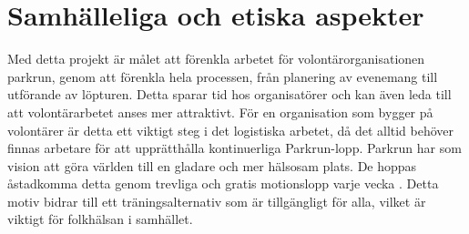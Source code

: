 \section{Samhälleliga och etiska aspekter}

Med detta projekt är målet att förenkla arbetet för volontärorganisationen parkrun, genom att förenkla hela processen, från planering av evenemang till utförande av löpturen. Detta sparar tid hos organisatörer och kan även leda till att volontärarbetet anses mer attraktivt. För en organisation som bygger på volontärer är detta ett viktigt steg i det logistiska arbetet, då det alltid behöver finnas arbetare för att upprätthålla kontinuerliga Parkrun-lopp. Parkrun har som vision att göra världen till en gladare och mer hälsosam plats. De hoppas åstadkomma detta genom trevliga och gratis motionslopp varje vecka \cite{omOss}. Detta motiv bidrar till ett träningsalternativ som är tillgängligt för alla, vilket är viktigt för folkhälsan i samhället.